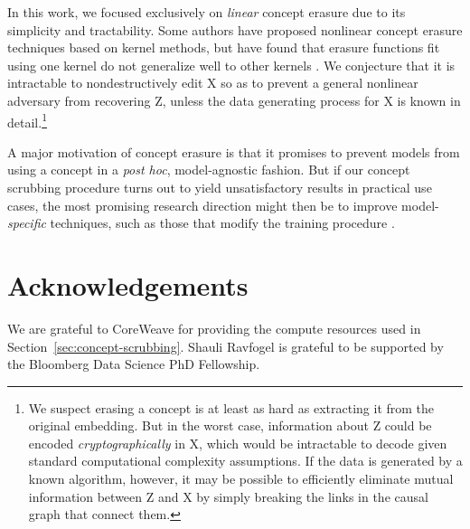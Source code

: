\documentclass{article}
\theoremstyle{plain}
\theoremstyle{remark}
\theoremstyle{plain}
\theoremstyle{TheoremNum}
\newcommand{\rv}[1]{{\mathrm{#1}}}
\begin{document}
In this work, we focused exclusively on \emph{linear} concept erasure due to its simplicity and tractability. Some authors have proposed nonlinear concept erasure techniques based on kernel methods, but have found that erasure functions fit using one kernel do not generalize well to other kernels \cite{ravfogel2022adversarial, shao-etal-2023-gold}. We conjecture that it is intractable to nondestructively edit $\rv X$ so as to prevent a general nonlinear adversary from recovering $\rv Z$, unless the data generating process for $\rv X$ is known in detail.\footnote{We suspect erasing a concept is at least as hard as extracting it from the original embedding. But in the worst case, information about $\rv Z$ could be encoded \emph{cryptographically} in $\rv X$, which would be intractable to decode given standard computational complexity assumptions. If the data is generated by a known algorithm, however, it may be possible to efficiently eliminate mutual information between $\rv Z$ and $\rv X$ by simply breaking the links in the causal graph that connect them.}

A major motivation of concept erasure is that it promises to prevent models from using a concept in a \emph{post hoc}, model-agnostic fashion. But if our concept scrubbing procedure turns out to yield unsatisfactory results in practical use cases, the most promising research direction might then be to improve model-\emph{specific} techniques, such as those that modify the training procedure \cite{edwards2015censoring, elazar-goldberg-2018-adversarial, geiger2022inducing}.

\section{Acknowledgements}

We are grateful to CoreWeave for providing the compute resources used in Section~\ref{sec:concept-scrubbing}. Shauli Ravfogel is grateful to be supported by the Bloomberg Data Science PhD Fellowship.




\appendix
\clearpage
\end{document}
